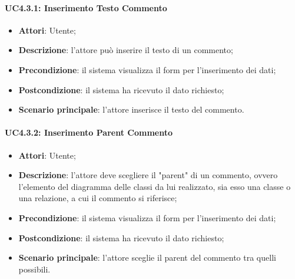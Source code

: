 \begin{itemize}
\begin{itemize}
\begin{itemize}
\begin{itemize}
\paragraph{UC4.3.1: Inserimento Testo Commento}
\label{UC4.3.1}
\begin{itemize}
	\item \textbf{Attori}: Utente;
	\item \textbf{Descrizione}: l'attore può inserire il testo di un commento;
	\item \textbf{Precondizione}: il sistema visualizza il form per l'inserimento dei dati;
	\item \textbf{Postcondizione}: il sistema ha ricevuto il dato richiesto;
	\item \textbf{Scenario principale}: l'attore inserisce il testo del commento.
\end{itemize}

\paragraph{UC4.3.2: Inserimento Parent Commento}
\label{UC4.3.2}
\begin{itemize}
	\item \textbf{Attori}: Utente;
	\item \textbf{Descrizione}: l'attore deve scegliere il "parent" di un commento, ovvero l'elemento del diagramma delle classi da lui realizzato, sia esso una classe o una relazione, a cui il commento si riferisce;
	\item \textbf{Precondizione}: il sistema visualizza il form per l'inserimento dei dati;
	\item \textbf{Postcondizione}: il sistema ha ricevuto il dato richiesto;
	\item \textbf{Scenario principale}: l'attore sceglie il parent del commento tra quelli possibili.
\end{itemize}


\end{itemize}
\end{itemize}
\end{itemize}
\end{itemize}
